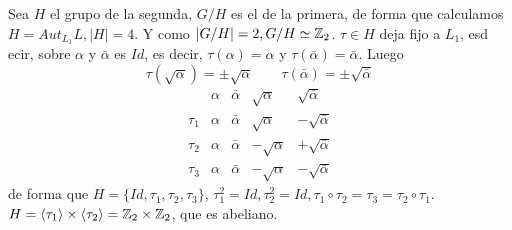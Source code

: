 \begin{dem}
     Sea $H$ el grupo de la segunda, $G/H$ es el de la primera, de forma que calculamos $H = Aut_{L_1} L, |H|=4$. Y como $|G/H| = 2, G/H \simeq \mathbb{Z}_2$. $\tau \in H$ deja fijo a $L_1$, esd ecir, sobre $\alpha$ y $\bar \alpha$ es $Id$, es decir, $\tau(\alpha) = \alpha$ y $\tau(\bar \alpha) = \bar \alpha$. Luego
     $$\tau(\sqrt{\alpha}) = \pm \sqrt{\alpha} \qquad \tau(\bar \alpha) = \pm \sqrt{\bar \alpha}$$
     $$\begin{array}{c|c|c|c|c}
        & \alpha & \bar \alpha & \sqrt{\alpha} & \sqrt{\bar \alpha} \\ \hline 
        \tau_1 & \alpha & \bar \alpha & \sqrt{\alpha} & -\sqrt{\bar \alpha}\\\hline 
        \tau_2 & \alpha & \bar \alpha & -\sqrt{\alpha} & +\sqrt{\bar \alpha} \\\hline 
        \tau_3 & \alpha & \bar \alpha & -\sqrt{\alpha} & - \sqrt{\bar \alpha}
    \end{array}$$
    de forma que $H = \{Id, \tau_1, \tau_2, \tau_3\}$, $\tau_1^2 = Id, \tau_2^2 = Id, \tau_1\circ \tau_2 = \tau_3 = \tau_2 \circ \tau_1$. $H = \langle \tau_1 \rangle \times \langle \tau_2 \rangle = \mathbb{Z}_2 \times \mathbb{Z}_2$, que es abeliano. 


\end{dem}
